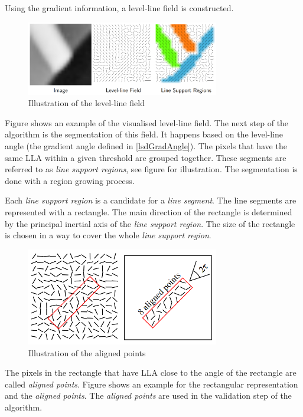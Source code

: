 Using the gradient information, a level-line field is constructed.
\begin{figure}[ht]
	\centering
	\includegraphics[width=0.75\textwidth]{figures/lsd_level_line_field.png}
	\caption{Illustration of the level-line field\cite{LSDDet}}
	\label{fig:lsdLevelLines}
\end{figure}
Figure  shows an example of the visualised level-line field.
The next step of the algorithm is the segmentation of this field.
It happens based on the level-line angle (the gradient angle defined in \eqref{lsdGradAngle}).
The pixels that have the same LLA within a given threshold are grouped together.
These segments are referred to as \textit{line support regions}, see figure  for illustration.
The segmentation is done with a region growing process.

Each \textit{line support region} is a candidate for a \textit{line segment}\cite{LSDDet}.
The line segments are represented with a rectangle.
The main direction of the rectangle is determined by the principal inertial axis of the \textit{line support region}.
The size of the rectangle is chosen in a way to cover the whole \textit{line support region}.

\begin{figure}[ht]
	\centering
	\includegraphics[width=0.75\textwidth]{figures/lsd_aligned_point.png}
	\caption{Illustration of the aligned points\cite{LSDDet}}
	\label{fig:lsdAligned}
\end{figure}
The pixels in the rectangle that have LLA close to the angle of the rectangle are called \textit{aligned points}\cite{LSDDet}.
Figure  shows an example for the rectangular representation and the \textit{aligned points}.
The \textit{aligned points} are used in the validation step of the algorithm.

